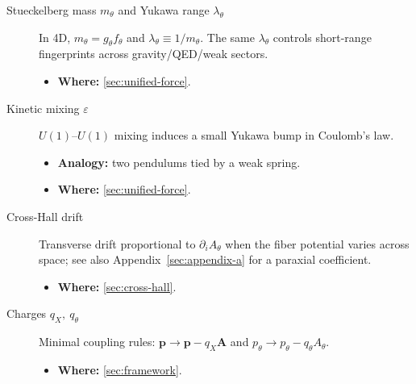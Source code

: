 \begin{description}
  \item[Stueckelberg mass $m_\theta$ and Yukawa range $\lambda_\theta$] In 4D, $m_\theta=g_\theta f_\theta$ and $\lambda_\theta\equiv 1/m_\theta$. The same $\lambda_\theta$ controls short-range fingerprints across gravity/QED/weak sectors.
  \begin{itemize}
    \item \textbf{Where:} \cref{sec:unified-force}.
  \end{itemize}

  \item[Kinetic mixing $\varepsilon$] $U(1)$--$U(1)$ mixing induces a small Yukawa bump in Coulomb's law.
  \begin{itemize}
    \item \textbf{Analogy:} two pendulums tied by a weak spring.
    \item \textbf{Where:} \cref{sec:unified-force}.
  \end{itemize}

  \item[Cross-Hall drift] Transverse drift proportional to $\partial_i A_\theta$ when the fiber potential varies across space; see also Appendix~\ref{sec:appendix-a} for a paraxial coefficient.
  \begin{itemize}
    \item \textbf{Where:} \cref{sec:cross-hall}.
  \end{itemize}

  \item[Charges $q_X,\ q_\theta$] Minimal coupling rules: $\mathbf p\to\mathbf p-q_X\mathbf A$ and $p_\theta\to p_\theta-q_\theta A_\theta$.
  \begin{itemize}
    \item \textbf{Where:} \cref{sec:framework}.
  \end{itemize}
\end{description}
